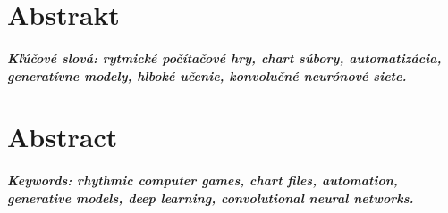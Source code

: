 \documentclass[12pt, oneside]{book}  %
\begin{document}
\vfill\eject


\newpage
\thispagestyle{empty}
\chapter*{Abstrakt}\label{chap:abstract_sk}


\paragraph*{Kľúčové slová: rytmické počítačové hry, chart súbory, automatizácia, generatívne modely, hlboké učenie, konvolučné neurónové siete.}


\newpage
\thispagestyle{empty}
\chapter*{Abstract}\label{chap:abstract_en}


\paragraph*{Keywords: rhythmic computer games, chart files, automation, generative models, deep learning, convolutional neural networks.}




\newpage
\tableofcontents



\newpage
\listoffigures
\listoftables


\mainmatter















\backmatter

\nocite{*}



\end{document}
